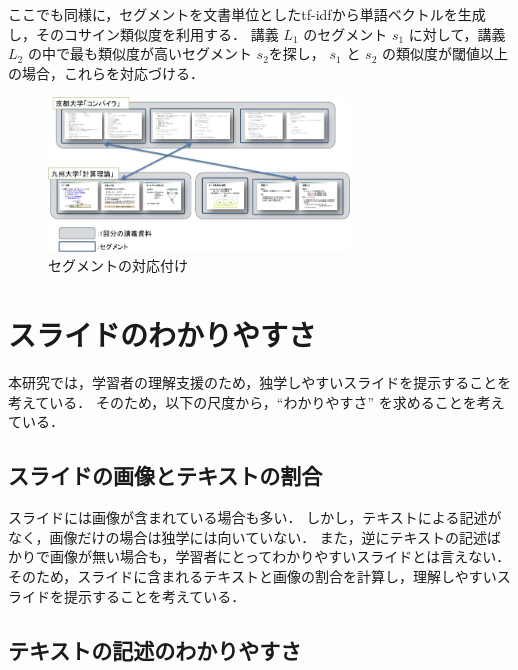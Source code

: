 \documentclass{js}
\begin{document}
ここでも同様に，セグメントを文書単位としたtf-idfから単語ベクトルを生成し，そのコサイン類似度を利用する．
講義 $L_1$ のセグメント $s_1$ に対して，講義$L_2$ の中で最も類似度が高いセグメント $s_2$を探し，
$s_1$ と $s_2$ の類似度が閾値以上の場合，これらを対応づける．

\begin{figure}[tb]
 \begin{center}
  \includegraphics[width=8cm,bb=0 0 779 398]{segsim.jpg}
 \end{center}
 \caption{セグメントの対応付け}
 \label{fig:segsim}
\end{figure}






\section{スライドのわかりやすさ}

本研究では，学習者の理解支援のため，独学しやすいスライドを提示することを考えている．
そのため，以下の尺度から，``わかりやすさ'' を求めることを考えている．

\subsection{スライドの画像とテキストの割合}

スライドには画像が含まれている場合も多い．
しかし，テキストによる記述がなく，画像だけの場合は独学には向いていない．
また，逆にテキストの記述ばかりで画像が無い場合も，学習者にとってわかりやすいスライドとは言えない．
そのため，スライドに含まれるテキストと画像の割合を計算し，理解しやすいスライドを提示することを考えている．


\subsection{テキストの記述のわかりやすさ}
\end{document}
